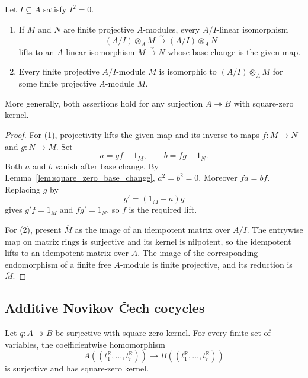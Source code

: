 \begin{lemma}
  \label{lem:vect_square_zero_deform}
  \leanok
  Let $I\subseteq A$ satisfy $I^2=0$.
  \begin{enumerate}
    \item If $M$ and $N$ are finite projective $A$-modules, every
      $A/I$-linear isomorphism
      \[
        (A/I)\otimes_A M\xrightarrow{\sim}(A/I)\otimes_A N
      \]
      lifts to an $A$-linear isomorphism $M\xrightarrow{\sim}N$ whose base
      change is the given map.
    \item Every finite projective $A/I$-module $\overline M$ is isomorphic to
      $(A/I)\otimes_A M$ for some finite projective $A$-module $M$.
  \end{enumerate}
  More generally, both assertions hold for any surjection $A\twoheadrightarrow
  B$ with square-zero kernel.
\end{lemma}

\begin{proof}
  \leanok
  For (1), projectivity lifts the given map and its inverse to maps
  $f\colon M\to N$ and $g\colon N\to M$.  Set
  \[
    a=gf-1_M,\qquad b=fg-1_N.
  \]
  Both $a$ and $b$ vanish after base change.  By
  Lemma~\ref{lem:square_zero_base_change}, $a^2=b^2=0$.  Moreover
  $fa=bf$.  Replacing $g$ by
  \[
    g'=(1_M-a)g
  \]
  gives $g'f=1_M$ and $fg'=1_N$, so $f$ is the required lift.

  For (2), present $\overline M$ as the image of an idempotent matrix over
  $A/I$.  The entrywise map on matrix rings is surjective and its kernel is
  nilpotent, so the idempotent lifts to an idempotent matrix over $A$.  The
  image of the corresponding endomorphism of a finite free $A$-module is
  finite projective, and its reduction is $\overline M$.
\end{proof}

\subsection{Additive Novikov \v{C}ech cocycles}

\begin{lemma}
  \label{lem:novikov_square_zero_coefficients}
  \leanok
  Let $q\colon A\twoheadrightarrow B$ be surjective with square-zero kernel.
  For every finite set of variables, the coefficientwise homomorphism
  \[
    A((t_1^{\mathbb{R}},\ldots,t_r^{\mathbb{R}}))
      \longrightarrow
    B((t_1^{\mathbb{R}},\ldots,t_r^{\mathbb{R}}))
  \]
  is surjective and has square-zero kernel.
\end{lemma}

